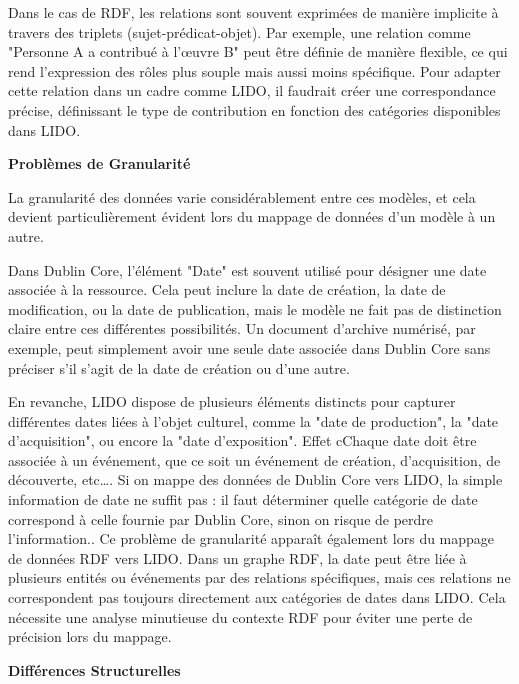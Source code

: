 Dans le cas de RDF, les relations sont souvent exprimées de manière implicite à travers des triplets (sujet-prédicat-objet). Par exemple, une relation comme "Personne A a contribué à l'œuvre B" peut être définie de manière flexible, ce qui rend l’expression des rôles plus souple mais aussi moins spécifique. Pour adapter cette relation dans un cadre comme LIDO, il faudrait créer une correspondance précise, définissant le type de contribution en fonction des catégories disponibles dans LIDO.\newline

\textbf{Problèmes de Granularité}\newline

La granularité des données varie considérablement entre ces modèles, et cela devient particulièrement évident lors du mappage de données d'un modèle à un autre.\newline

Dans Dublin Core, l’élément "Date" est souvent utilisé pour désigner une date associée à la ressource. Cela peut inclure la date de création, la date de modification, ou la date de publication, mais le modèle ne fait pas de distinction claire entre ces différentes possibilités. Un document d'archive numérisé, par exemple, peut simplement avoir une seule date associée dans Dublin Core sans préciser s'il s'agit de la date de création ou d'une autre.\newline

En revanche, LIDO dispose de plusieurs éléments distincts pour capturer différentes dates liées à l’objet culturel, comme la "date de production", la "date d'acquisition", ou encore la "date d’exposition". Effet  cChaque date doit être associée à un événement, que ce soit un événement de création, d'acquisition, de découverte, etc…. Si on mappe des données de Dublin Core vers LIDO, la simple information de date ne suffit pas : il faut déterminer quelle catégorie de date correspond à celle fournie par Dublin Core, sinon on risque de perdre l’information..
Ce problème de granularité apparaît également lors du mappage de données RDF vers LIDO. Dans un graphe RDF, la date peut être liée à plusieurs entités ou événements par des relations spécifiques, mais ces relations ne correspondent pas toujours directement aux catégories de dates dans LIDO. Cela nécessite une analyse minutieuse du contexte RDF pour éviter une perte de précision lors du mappage. \newline

\textbf{Différences Structurelles}\newline

